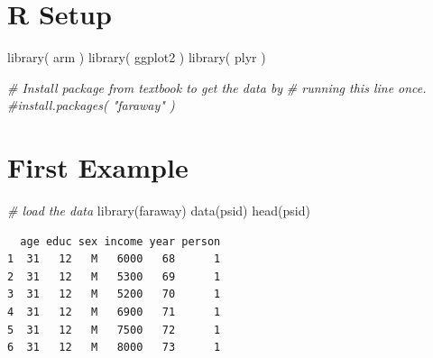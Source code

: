 \documentclass[
  letterpaper,
  DIV=11,
  numbers=noendperiod]{scrreprt}
\newenvironment{Shaded}{}{}
\newcommand{\AttributeTok}[1]{\textcolor[rgb]{0.49,0.56,0.16}{#1}}
\newcommand{\CommentTok}[1]{\textcolor[rgb]{0.38,0.63,0.69}{\textit{#1}}}
\newcommand{\DecValTok}[1]{\textcolor[rgb]{0.25,0.63,0.44}{#1}}
\newcommand{\FunctionTok}[1]{\textcolor[rgb]{0.02,0.16,0.49}{#1}}
\newcommand{\NormalTok}[1]{#1}
\newcommand{\OtherTok}[1]{\textcolor[rgb]{0.00,0.44,0.13}{#1}}
\newcommand{\SpecialCharTok}[1]{\textcolor[rgb]{0.25,0.44,0.63}{#1}}
\begin{document}
\section{R Setup}\label{r-setup-3}

\begin{Shaded}
\begin{Highlighting}[]
\FunctionTok{library}\NormalTok{( arm )}
\FunctionTok{library}\NormalTok{( ggplot2 )}
\FunctionTok{library}\NormalTok{( plyr )}

\CommentTok{\# Install package from textbook to get the data by }
\CommentTok{\# running this line once.}
\CommentTok{\#install.packages( "faraway" )}
\end{Highlighting}
\end{Shaded}

\section{First Example}\label{first-example}

\begin{Shaded}
\begin{Highlighting}[]
\CommentTok{\# load the data}
\FunctionTok{library}\NormalTok{(faraway)}
\FunctionTok{data}\NormalTok{(psid)}
\FunctionTok{head}\NormalTok{(psid)}
\end{Highlighting}
\end{Shaded}

\begin{verbatim}
  age educ sex income year person
1  31   12   M   6000   68      1
2  31   12   M   5300   69      1
3  31   12   M   5200   70      1
4  31   12   M   6900   71      1
5  31   12   M   7500   72      1
6  31   12   M   8000   73      1
\end{verbatim}

\begin{Shaded}
\end{Shaded}
\end{document}

